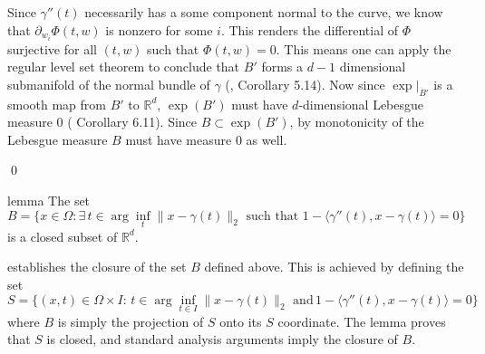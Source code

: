 \documentclass[11pt]{article}
\begin{document}
Since $\gamma''(t)$ necessarily has a some component normal to the curve, we know that $\partial_{w_i}\Phi(t,w)$ is nonzero for some $i$. This renders the differential of $\Phi$ surjective for all $(t,w)$ such that $\Phi(t,w) = 0$. This means one can apply the regular level set theorem to conclude that $B'$ forms a $d-1$ dimensional submanifold of the normal bundle of $\gamma$ (\citet{lee2003smooth}, Corollary 5.14). Now since $\exp\big|_{B'}$ is a smooth map from $B'$ to $\mathbb{R}^d$, $\exp(B')$ must have $d$-dimensional Lebesgue measure $0$ (\citet{lee2003smooth} Corollary 6.11). Since $B \subset \exp(B')$, by monotonicity of the Lebesgue measure $B$ must have measure $0$ as well.

\qed{}



\begin{restatable}{lemma}{} \label{lemma: IFT degen closed}
    The set 
    \begin{equation}
    B= \{x \in \Omega : \exists \,t \in \arg\inf_t \|x-\gamma(t)\|_2 \text{ such that } 1 - \langle\gamma''(t), x-\gamma(t)\rangle = 0 \}
    \end{equation}
    is a closed subset of $\mathbb{R}^d$. 
\end{restatable}
\noindent {} establishes the closure of the set $B$ defined above. This is achieved by defining the set 
\[S= \{(x,t) \in \Omega\times I : \, t \in \arg\inf_{t\in I}\|x-\gamma(t)\|_2 \text{ and} \, 1 - \langle\gamma''(t), x - \gamma(t)\rangle = 0\} \]
where $B$ is simply the projection of $S$ onto its $S$ coordinate. The lemma proves that $S$ is closed, and standard analysis arguments imply the closure of $B$.  
\end{document}
